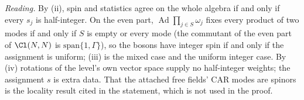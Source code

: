\emph{Reading.} By (ii), spin and statistics agree on the whole algebra if and only if every $s_{j}$ is half-integer. On the even part, $\operatorname{Ad}\prod_{j \in S}\omega_{j}$ fixes every product of two modes if and only if $S$ is empty or every mode (the commutant of the even part of $\Cl(N,N)$ is $\mathrm{span}\{1, \Gamma\}$), so the bosons have integer spin if and only if the assignment is uniform; (iii) is the mixed case and the uniform integer case. By (iv) rotations of the level's own vector space supply no half-integer weights; the assignment $s$ is extra data. That the attached free fields' CAR modes are spinors is the locality result cited in the statement, which is not used in the proof.
